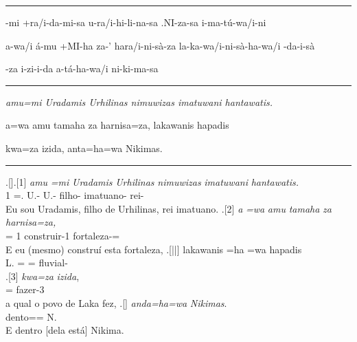 \vspace{10pt}
\hrule
\vspace{10pt}

\setcounter{parcount}{0}
\begin{parnumbersa}[]

	\raggedright%
	\itshape%

	-mi
	+ra/i-da-mi-sa
	u-ra/i-hi-li-na-sa
	.NI-za-sa
	i-ma-tú-wa/i-ni 

	a-wa/i á-mu +MI-ha za-' hara/i-ni-sà-za
	la-ka-wa/i-ni-sà-ha-wa/i -da-i-sà

	-za i-zi-i-da a-tá-ha-wa/i ni-ki-ma-sa


\end{parnumbersa}

\vspace{10pt}
\hrule
\vspace{10pt}


\setcounter{parcount}{0}
\begin{parnumbersa}[]

	\raggedright%
	\itshape%
	amu=mi Uradamis Urhilinas nimuwizas imatuwani hantawatis.

	a=wa amu tamaha za harnisa=za, lakawanis hapadis

	kwa=za izida, anta=ha=wa Nikimas.


\end{parnumbersa}

\vspace{10pt}
\hrule
\vspace{20pt}


\clearpage%

\ex.[]\ag.[1] \emph{amu} \emph{=mi} \emph{Uradamis} \emph{Urhilinas}
\emph{nimuwizas} \emph{imatuwani} \emph{hantawatis.}\\
\Pro{}1\Sg{} =\Refl{}. U.-\Com{}\Nom{}\Sg{} U.-\Com{}\Gen{}\Sg{} filho-\Com{}\Nom{}\Sg{}
imatuano-\Com{}\Nom{}\Sg{} rei-\Com{}\Nom{}\Sg{}\\
Eu sou Uradamis, filho de Urhilinas, rei imatuano.
\bg.[2] \emph{a} \emph{=wa} \emph{amu} \emph{tamaha} \emph{za} \emph{harnisa=za,}\\
\Conj{} =\Clt{} \Pro{}1\Sg{} construir-1\Sg{}\Pret{} \Pro{}\Neut{}\Acu{}\Sg{}
fortaleza-\Neut{}\Acu{}\Sg{}=\Clt{}\\
E eu (mesmo) construí esta fortaleza,
\bg.[||] lakawanis =ha =wa hapadis\\
L.\Com{}\Nom{}\Sg{} =\Conj{} =\Clt{} fluvial-\Com{}\Nom{}\Sg{}\\
\bg.[3] \emph{kwa=za} \emph{izida},\\
\Rel{}\Neut{}\Acu{}\Sg{}=\Clt{} fazer-3\Sg{}\Pret{}\\
a qual o povo de Laka fez,
\bg.[] \emph{anda=ha=wa} \emph{Nikimas}.\\
dento=\Conj{}=\Clt{} N.\Com{}\Nom{}\Sg{}\\
E dentro [dela está] Nikima.



